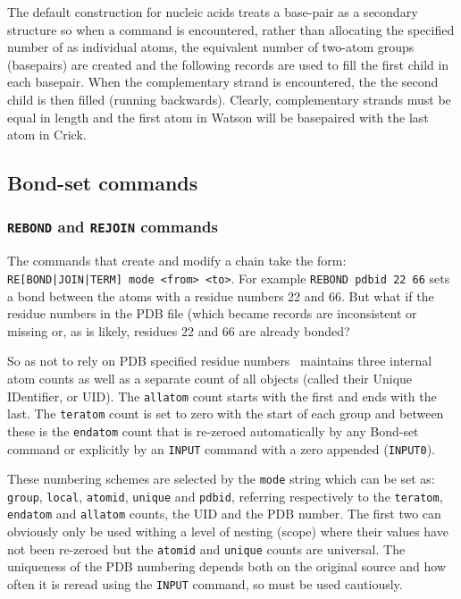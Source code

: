 The default construction for nucleic acids treats a base-pair as a secondary structure so when
a  command is encountered, rather than allocating the specified number of 
as individual atoms, the equivalent number of two-atom groups (basepairs) are created and the
following  records are used to fill the first child in each basepair.   When the 
complementary strand is encountered, the the second child is then filled (running backwards).
Clearly, complementary strands must be equal in length and the first atom in Watson will be
basepaired with the last atom in Crick. 


\subsection{Bond-set commands}

\subsubsection{{\tt REBOND} and {\tt REJOIN} commands}

The commands that create and modify a chain take the form: {\tt RE[BOND|JOIN|TERM] mode <from> <to>}.
For example {\tt REBOND pdbid 22 66} sets a bond between the atoms with a residue numbers 22 and 66.
But what if the residue numbers in the PDB file (which became  records are inconsistent or
missing or, as is likely, residues 22 and 66 are already bonded?

So as not to rely on PDB specified residue numbers \NAME\ maintains three internal atom counts as
well as a separate count of all objects (called their Unique IDentifier, or UID).  The {\tt allatom}
count starts with the first and ends with the last.  The {\tt teratom} count is set to zero with the
start of each group and between these is the {\tt endatom} count that is re-zeroed automatically by
any Bond-set command or explicitly by an {\tt INPUT} command with a zero appended ({\tt INPUT0}).

These numbering schemes are selected by the {\tt mode} string which can be set as: {\tt group}, {\tt local},
{\tt atomid}, {\tt unique} and {\tt pdbid}, referring respectively to the  {\tt teratom},  {\tt endatom}
and  {\tt allatom} counts, the UID and the PDB number.   The first two can obviously only be used
withing a level of nesting (scope) where their values have not been re-zeroed but the {\tt atomid} and
{\tt unique} counts are universal.   The uniqueness of the PDB numbering depends both on the
original source and how often it is reread using the {\tt INPUT} command, so must be used cautiously.

